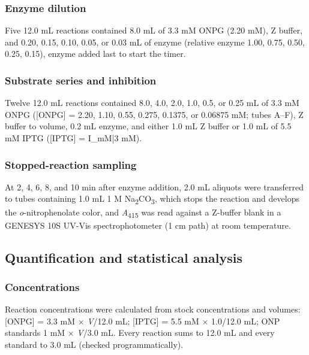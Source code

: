 \documentclass[9pt,twocolumn]{extarticle}
\newcommand{\Aa}{\textit{A}\textsubscript{415}}
\newcommand{\dash}{–}
\begin{document}
\subsubsection{Enzyme dilution}
Five 12.0 mL reactions contained 8.0 mL of 3.3 mM ONPG (2.20 mM), Z buffer, and 0.20, 0.15, 0.10, 0.05, or 0.03 mL of enzyme (relative enzyme 1.00, 0.75, 0.50, 0.25, 0.15), enzyme added last to start the timer.
\subsubsection{Substrate series and inhibition}
Twelve 12.0 mL reactions contained 8.0, 4.0, 2.0, 1.0, 0.5, or 0.25 mL of 3.3 mM ONPG ([ONPG] = 2.20, 1.10, 0.55, 0.275, 0.1375, or 0.06875 mM; tubes A\dash F), Z buffer to volume, 0.2 mL enzyme, and either 1.0 mL Z buffer or 1.0 mL of 5.5 mM IPTG ([IPTG] = {{I_mM|3}} mM).
\subsubsection{Stopped-reaction sampling}
At 2, 4, 6, 8, and 10 min after enzyme addition, 2.0 mL aliquots were transferred to tubes containing 1.0 mL 1 M Na\textsubscript{2}CO\textsubscript{3}, which stops the reaction and develops the \textit{o}-nitrophenolate color, and \Aa{} was read against a Z-buffer blank in a GENESYS 10S UV-Vis spectrophotometer (1 cm path) at room temperature.

\subsection{Quantification and statistical analysis}
\subsubsection{Concentrations}
Reaction concentrations were calculated from stock concentrations and volumes: [ONPG] = 3.3 mM × \textit{V}/12.0 mL; [IPTG] = 5.5 mM × 1.0/12.0 mL; ONP standards 1 mM × \textit{V}/3.0 mL. Every reaction sums to 12.0 mL and every standard to 3.0 mL (checked programmatically).
\end{document}
